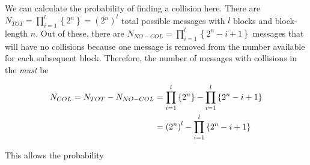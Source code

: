 \documentclass[../midterm.tex]{subfiles}
\begin{document}
\begin{flushleft}




 We can calculate the probability of finding a collision here.  There are $N_{TOT} = \prod_{i = 1}^l \left\{ 2^n \right\} = \left( 2^n \right)^l$ total possible messages with $l$ blocks and block-length $n$.  Out of these, there are $N_{NO-COL} = \prod_{i = 1}^l \left\{ 2^n - i + 1 \right\}$ messages that will have no collisions because one message is removed from the number available for each subsequent block. Therefore, the number of messages with collisions in the \emph{must} be

\begin{align}
N_{COL} = N_{TOT} - N_{NO-COL} &= \prod_{i = 1}^l \left\{ 2^n \right\} - \prod_{i = 1}^l \left\{ 2^n - i + 1 \right\} \notag \\
&= \left( 2^n \right)^l - \prod_{i = 1}^l \left\{ 2^n - i + 1 \right\}
\end{align}


This allows the probability  




















\end{flushleft}
\end{document}
